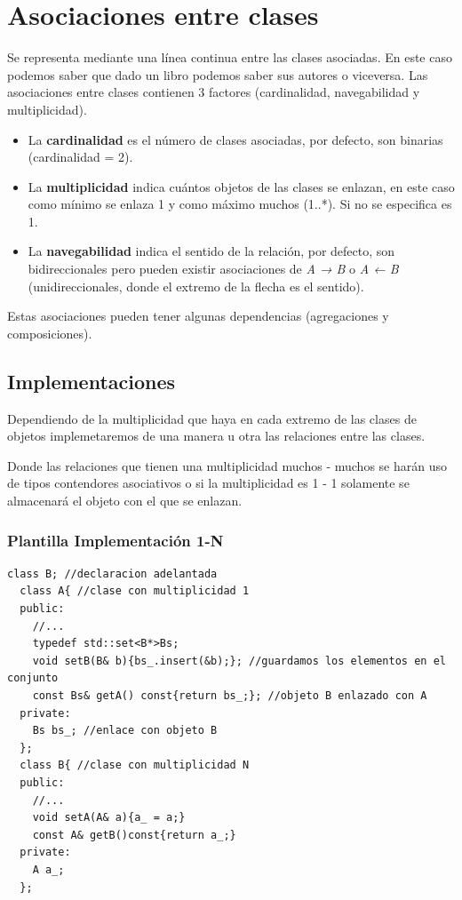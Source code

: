 \chapter{Asociaciones entre clases}


Se representa mediante una línea continua entre las clases asociadas.
En este caso podemos saber que dado un libro podemos saber sus autores o viceversa.
Las asociaciones entre clases contienen 3 factores (cardinalidad, navegabilidad y multiplicidad).
\begin{itemize}
	\item La \textbf{cardinalidad} es el número de clases asociadas, por defecto, son binarias (cardinalidad = 2).
	\item La \textbf{multiplicidad} indica cuántos objetos de las clases se enlazan, en este caso como mínimo se enlaza 1 y como máximo muchos (1..*). Si no se especifica es 1.
	\item La \textbf{navegabilidad} indica el sentido de la relación, por defecto, son bidireccionales pero pueden existir asociaciones de \textit{A → B} o \textit{A ← B} (unidireccionales, donde el extremo de la flecha es el sentido).
\end{itemize}
Estas asociaciones pueden tener algunas dependencias (agregaciones y composiciones).
\section{Implementaciones}
Dependiendo de la multiplicidad que haya en cada extremo de las clases de objetos implemetaremos de una manera u 
otra las relaciones entre las clases.

Donde las relaciones que tienen una multiplicidad muchos - muchos se harán uso de tipos contendores asociativos o si la 
multiplicidad es 1 - 1 solamente se almacenará el objeto con el que se enlazan.

\subsection{Plantilla Implementación 1-N}
\begin{center}
\begin{lstlisting}[frame=single]
  class B; //declaracion adelantada
  class A{ //clase con multiplicidad 1
  public:
    //...
    typedef std::set<B*>Bs;
    void setB(B& b){bs_.insert(&b);}; //guardamos los elementos en el conjunto
    const Bs& getA() const{return bs_;}; //objeto B enlazado con A
  private:
    Bs bs_; //enlace con objeto B
  };
  class B{ //clase con multiplicidad N
  public:
    //...
    void setA(A& a){a_ = a;}
    const A& getB()const{return a_;}
  private:
    A a_;
  };
\end{lstlisting}
\end{center}
\newpage

